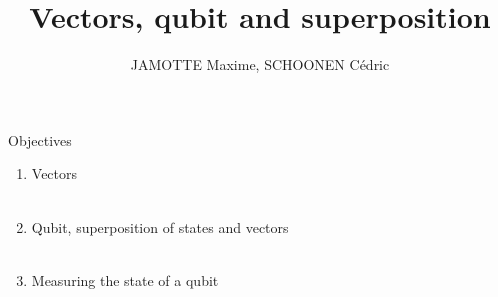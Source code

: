 \documentclass[aspectratio=169,12pt]{beamer}
\begin{document}
\title{Vectors, qubit and superposition}
\author{JAMOTTE Maxime, SCHOONEN Cédric}
\date{}

\begin{frame}
  \titlepage
\end{frame}

\begin{frame}{Objectives}
  \begin{enumerate}
    \item Vectors\\~\\
    \item Qubit, superposition of states and vectors\\~\\
    \item Measuring the state of a qubit
  \end{enumerate}
\end{frame}
\end{document}
